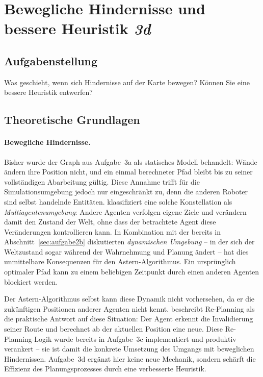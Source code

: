 
\section{Bewegliche Hindernisse und bessere Heuristik \textit{3d}}
\label{sec:aufgabe3d}

\subsection{Aufgabenstellung}

Was geschieht, wenn sich Hindernisse auf der Karte bewegen? Können Sie eine bessere Heuristik entwerfen?

\subsection{Theoretische Grundlagen}

\paragraph{Bewegliche Hindernisse.}
Bisher wurde der Graph aus Aufgabe~3a als statisches Modell behandelt: Wände ändern ihre Position nicht, und ein einmal berechneter Pfad bleibt bis zu seiner vollständigen Abarbeitung gültig. Diese Annahme trifft für die Simulationsumgebung jedoch nur eingeschränkt zu, denn die anderen Roboter sind selbst handelnde Entitäten. \textcite[S. 11]{5} klassifiziert eine solche Konstellation als \textit{Multiagentenumgebung}: Andere Agenten verfolgen eigene Ziele und verändern damit den Zustand der Welt, ohne dass der betrachtete Agent diese Veränderungen kontrollieren kann. In Kombination mit der bereits in Abschnitt~\ref{sec:aufgabe2b} diskutierten \textit{dynamischen Umgebung} -- in der sich der Weltzustand sogar während der Wahrnehmung und Planung ändert -- hat dies unmittelbare Konsequenzen für den \acs{Astern}-Algorithmus. Ein ursprünglich optimaler Pfad kann zu einem beliebigen Zeitpunkt durch einen anderen Agenten blockiert werden.

Der \acs{Astern}-Algorithmus selbst kann diese Dynamik nicht vorhersehen, da er die zukünftigen Positionen anderer Agenten nicht kennt. \textcite[S. 25]{5} beschreibt Re-Planning als die praktische Antwort auf diese Situation: Der Agent erkennt die Invalidierung seiner Route und berechnet ab der aktuellen Position eine neue. Diese Re-Planning-Logik wurde bereits in Aufgabe~3c implementiert und produktiv verankert -- sie ist damit die konkrete Umsetzung des Umgangs mit beweglichen Hindernissen. Aufgabe~3d ergänzt hier keine neue Mechanik, sondern schärft die Effizienz des Planungsprozesses durch eine verbesserte Heuristik.

